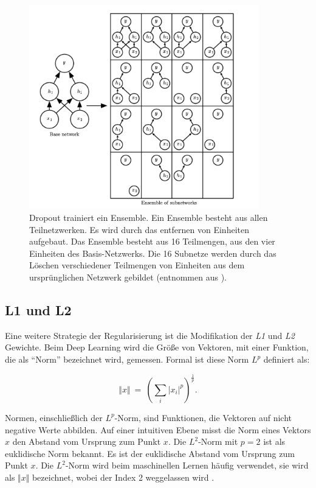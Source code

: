 \begin{figure}[H]
    \centering
    \includegraphics[width=10cm]{kapitel2/dropout.png}
    \caption[Dropout]{Dropout trainiert ein Ensemble. Ein Ensemble besteht aus allen Teilnetzwerken. Es wird durch das entfernen von Einheiten aufgebaut. Das Ensemble besteht aus 16 Teilmengen, aus den vier Einheiten des Basis-Netzwerks. Die 16 Subnetze werden durch das Löschen verschiedener Teilmengen von Einheiten aus dem ursprünglichen Netzwerk gebildet (entnommen aus \cite*[260]{IanGoodfellowYoshuaBengio2016}).}
    \label{Kap2:Dropout}
\end{figure}

\subsection{L1 und L2}
Eine weitere Strategie der Regularisierung ist die Modifikation der \textit{L1} und \textit{L2} Gewichte. Beim Deep Learning wird die Größe von Vektoren, mit einer Funktion, die als \enquote{Norm} bezeichnet wird, \cite*[39]{IanGoodfellowYoshuaBengio2016} gemessen. Formal ist diese Norm $L^p$ definiert als:

\begin{equation} \label{FormelNorm2}
    \Vert x\Vert \ =\ \left(\sum _{i}\bigr| x_{i}\bigr|^{p}\right)^{\frac{1}{p}}.
\end{equation}

Normen, einschließlich der $L^p$-Norm, sind Funktionen, die Vektoren auf nicht negative Werte abbilden. Auf einer intuitiven Ebene misst die Norm eines Vektors $x$ den Abstand vom Ursprung zum Punkt $x$. Die $L^2$-Norm mit $p = 2$ ist als euklidische Norm bekannt. Es ist der euklidische Abstand vom Ursprung zum Punkt $x$. Die $L^2$-Norm wird beim maschinellen Lernen häufig verwendet, sie wird als $\Vert x\Vert$ bezeichnet, wobei der Index 2 weggelassen wird \cite*[39]{IanGoodfellowYoshuaBengio2016}.

